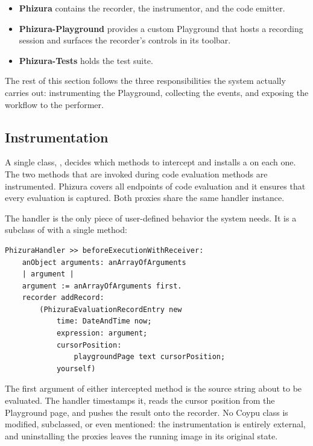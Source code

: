 \documentclass[
]{ceurart}
\begin{document}
\begin{itemize}
\item \textbf{Phizura} contains the recorder, the instrumentor, and the code emitter.
\item \textbf{Phizura-Playground} provides a custom Playground that hosts a recording session and surfaces the recorder's controls in its toolbar.
\item \textbf{Phizura-Tests} holds the test suite.
\end{itemize}

The rest of this section follows the three responsibilities the system actually carries out: instrumenting the Playground, collecting the events, and exposing the workflow to the performer.

\subsection{Instrumentation}

A single class, , decides which methods to intercept and installs a  on each one.
The two methods that are invoked during code evaluation methods are instrumented.
Phizura covers all endpoints of code evaluation and it ensures that every evaluation is captured.
Both proxies share the same handler instance.

The handler is the only piece of user-defined behavior the system needs.
It is a subclass of  with a single method:

\begin{lstlisting}[label={lst:handler-before},caption={PhizuraHandler before-execution hook}]
PhizuraHandler >> beforeExecutionWithReceiver:
    anObject arguments: anArrayOfArguments
    | argument |
    argument := anArrayOfArguments first.
    recorder addRecord:
        (PhizuraEvaluationRecordEntry new
            time: DateAndTime now;
            expression: argument;
            cursorPosition:
                playgroundPage text cursorPosition;
            yourself)
\end{lstlisting}

The first argument of either intercepted method is the source string about to be evaluated.
The handler timestamps it, reads the cursor position from the Playground page, and pushes the result onto the recorder.
No Coypu class is modified, subclassed, or even mentioned: the instrumentation is entirely external, and uninstalling the proxies leaves the running image in its original state.
\end{document}
